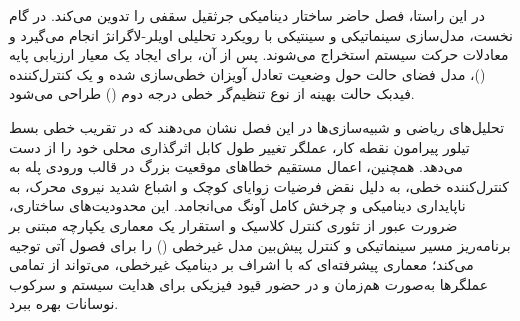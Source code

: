 در این راستا، فصل حاضر ساختار دینامیکی جرثقیل سقفی را تدوین می‌کند. در گام نخست، مدل‌سازی سینماتیکی و سینتیکی با رویکرد تحلیلی اویلر-لاگرانژ انجام می‌گیرد و معادلات حرکت سیستم استخراج می‌شوند. پس از آن، برای ایجاد یک معیار ارزیابی پایه ()، مدل فضای حالت حول وضعیت تعادل آویزان خطی‌سازی شده و یک کنترل‌کننده فیدبک حالت بهینه از نوع تنظیم‌گر خطی درجه دوم () طراحی می‌شود.

تحلیل‌های ریاضی و شبیه‌سازی‌ها در این فصل نشان می‌دهند که در تقریب خطی بسط تیلور پیرامون نقطه کار، عملگر تغییر طول کابل اثرگذاری محلی خود را از دست می‌دهد. همچنین، اعمال مستقیم خطاهای موقعیت بزرگ در قالب ورودی پله به کنترل‌کننده خطی، به دلیل نقض فرضیات زوایای کوچک و اشباع شدید نیروی محرک، به ناپایداری دینامیکی و چرخش کامل آونگ می‌انجامد. این محدودیت‌های ساختاری، ضرورت عبور از تئوری کنترل کلاسیک و استقرار یک معماری یکپارچه مبتنی بر برنامه‌ریز مسیر سینماتیکی و کنترل پیش‌بین مدل غیرخطی () را برای فصول آتی توجیه می‌کند؛ معماری پیشرفته‌ای که با اشراف بر دینامیک غیرخطی، می‌تواند از تمامی عملگرها به‌صورت هم‌زمان و در حضور قیود فیزیکی برای هدایت سیستم و سرکوب نوسانات بهره ببرد.
